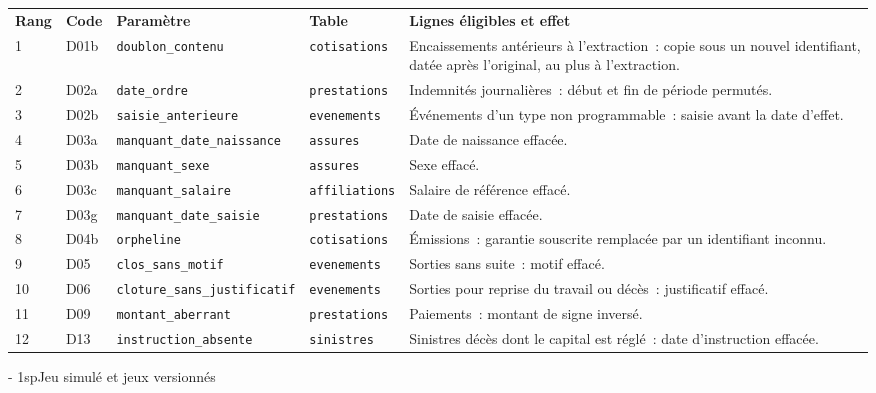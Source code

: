 \documentclass[a4paper,11pt]{article}
\makeatletter
\newcommand{\titrebandeau}[1]{%
  \noindent{\color{financeblue}\rule{\linewidth}{2.5pt}}
  \par\vspace{5mm}
  {\color{greenline}\raggedright\fontsize{19}{23}\bfseries\selectfont #1\par}
  \vspace{6mm}}
\newcommand{\charte@bandeau}[1]{%
  \parindent\z@ \everypar{\strut}%
  {\strut\par}\nobreak
  \titrebandeau{#1}\nobreak
  \kern\z@\nobreak\strut\par}
\newcommand{\charte@reserve}[1]{\par\ifinner\else\if@nobreak\else
  \penalty\z@ %
  \begingroup\setlength{\dimen@}{#1}%
  \dimen@ii\pagegoal \advance\dimen@ii-\pagetotal
  \ifdim\pagegoal=\maxdimen\else\ifdim\dimen@>\dimen@ii
    \vfil\penalty-\@M %
  \fi\fi\endgroup\fi\fi}
\renewcommand{\section}{\charte@reserve{12\baselineskip}%
  \@startsection{section}{1}{\z@}%
  {\z@}{1sp}{\normalfont\charte@bandeau}}
\newcommand{\code}[1]{\texttt{\small #1}}
\makeatother
\begin{document}
\begin{center}
\small
{}
\begin{tabular}{@{}p{0.8cm}p{1.1cm}p{4.8cm}p{2.3cm}>{\raggedright\arraybackslash}p{4.7cm}@{}}
\rowcolor{tableheader}
\textcolor{financeblue}{\textbf{Rang}} & \textcolor{financeblue}{\textbf{Code}} & \textcolor{financeblue}{\textbf{Paramètre}} & \textcolor{financeblue}{\textbf{Table}} & \textcolor{financeblue}{\textbf{Lignes éligibles et effet}} \\
1 & D01b & \code{doublon\_contenu} & \code{cotisations} & Encaissements antérieurs à l'extraction~: copie sous un nouvel identifiant, datée après l'original, au plus à l'extraction. \\
2 & D02a & \code{date\_ordre} & \code{prestations} & Indemnités journalières~: début et fin de période permutés. \\
3 & D02b & \code{saisie\_anterieure} & \code{evenements} & Événements d'un type non programmable~: saisie avant la date d'effet. \\
4 & D03a & \code{manquant\_date\_naissance} & \code{assures} & Date de naissance effacée. \\
5 & D03b & \code{manquant\_sexe} & \code{assures} & Sexe effacé. \\
6 & D03c & \code{manquant\_salaire} & \code{affiliations} & Salaire de référence effacé. \\
7 & D03g & \code{manquant\_date\_saisie} & \code{prestations} & Date de saisie effacée. \\
8 & D04b & \code{orpheline} & \code{cotisations} & Émissions~: garantie souscrite remplacée par un identifiant inconnu. \\
9 & D05 & \code{clos\_sans\_motif} & \code{evenements} & Sorties sans suite~: motif effacé. \\
10 & D06 & \code{cloture\_sans\_justificatif} & \code{evenements} & Sorties pour reprise du travail ou décès~: justificatif effacé. \\
11 & D09 & \code{montant\_aberrant} & \code{prestations} & Paiements~: montant de signe inversé. \\
12 & D13 & \code{instruction\_absente} & \code{sinistres} & Sinistres décès dont le capital est réglé~: date d'instruction effacée. \\
\end{tabular}
\end{center}

\section{Jeu simulé et jeux versionnés}
\label{sec:simulation-jeu}
\end{document}
